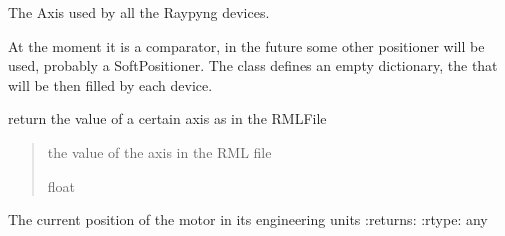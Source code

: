 \documentclass[letterpaper,10pt,english]{sphinxmanual}
\begin{document}
\begin{fulllineitems}
\label{\detokenize{API:raypyng_bluesky.axes.RaypyngAxis}}
\pysigstartsignatures
{}
\pysigstopsignatures
\sphinxAtStartPar
The Axis used by all the Raypyng devices.

\sphinxAtStartPar
At the moment it is a comparator, in the future some other positioner will be used,
probably a SoftPositioner.
The class defines an empty dictionary, the  that will be then filled by each device.

\begin{fulllineitems}
\label{\detokenize{API:raypyng_bluesky.axes.RaypyngAxis.get}}
\pysigstartsignatures
{}
\pysigstopsignatures
\sphinxAtStartPar
return the value of a certain axis as in the RMLFile
\begin{quote}\begin{description}
\sphinxAtStartPar
the value of the axis in the RML file

\sphinxAtStartPar
float

\end{description}\end{quote}

\end{fulllineitems}


\begin{fulllineitems}
\label{\detokenize{API:raypyng_bluesky.axes.RaypyngAxis.position}}
\pysigstartsignatures
{}
\pysigstopsignatures
\sphinxAtStartPar
The current position of the motor in its engineering units
:returns: 
:rtype: any

\end{fulllineitems}



\end{fulllineitems}
\end{document}
